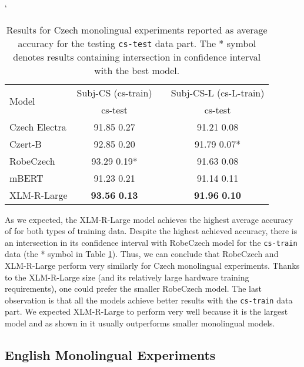 \documentclass[10pt, a4paper]{article}
\begin{document}
\begin{table}[ht!]
\catcode`
\begin{adjustbox}{width=0.95\linewidth,center}
\begin{tabular}{lccc} \toprule
 \multirow{2}{*}{Model}                       & \multicolumn{1}{c}{Subj-CS (cs-train)}  &   & \multicolumn{1}{c}{Subj-CS-L (cs-L-train)}                                  \\ \cline{2-2} \cline{4-4} 
        & \multicolumn{1}{c}{cs-test}  &       & \multicolumn{1}{c}{cs-test}     \\ \midrule
Czech Electra & 91.85  0.27\phantom{*}  & & 91.21  0.08\phantom{*} \\
Czert-B    & 92.85  0.20\phantom{*}  & & 91.79  0.07* \\
RobeCzech    & 93.29  0.19*   & & 91.63  0.08\phantom{*} \\
mBERT        & 91.23  0.21\phantom{*}  & & 91.14  0.11\phantom{*} \\
XLM-R-Large  & \textbf{93.56}  \textbf{0.13}\phantom{*}  & & \textbf{91.96}  \textbf{0.10\phantom{*}} \\ \bottomrule
\end{tabular}
\end{adjustbox}
\caption{Results for Czech monolingual experiments reported as average accuracy for the testing \texttt{cs-test} data part. The * symbol denotes results containing intersection in confidence interval with the best model.} \label{tab:monolingual-cs}
\end{table}

\par As we expected, the XLM-R-Large model achieves the highest average accuracy of  for both types of training data. Despite the highest achieved accuracy, there is an intersection in its confidence interval with RobeCzech model for the \texttt{cs-train} data
(the * symbol in Table \ref{tab:monolingual-cs}). Thus, we can conclude that RobeCzech and XLM-R-Large perform very similarly for Czech monolingual experiments. Thanks to the XLM-R-Large size (and its relatively large hardware training requirements), one could prefer the smaller RobeCzech model. The last observation is that all the models achieve better results with the \texttt{cs-train} data part. We expected XLM-R-Large to perform very well because it is the largest model and as shown in \cite{priban-steinberger-2021-multilingual} it usually outperforms smaller monolingual models.


\subsection{English Monolingual Experiments}
\label{sec:english-monolingual-experiments}
\end{document}
